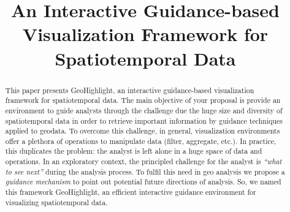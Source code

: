 \documentclass[conference]{IEEEtran}
\newcommand{\sys}{{\sc GeoHighlight}}
\begin{document}
\title{An Interactive Guidance-based Visualization Framework for Spatiotemporal Data}


\author{
\and
{}
}

\maketitle


\begin{abstract}
This paper presents \sys, an interactive guidance-based visualization framework for spatiotemporal data. The main objective of your proposal is provide an environment to guide analysts through the challenge due the huge size and diversity of spatiotemporal data in order to retrieve important information by guidance techniques applied to geodata.  To overcome this challenge, in general, visualization environments offer a plethora of operations to manipulate data (filter, aggregate, etc.). In practice, this duplicates the problem: the analyst is left alone in a huge space of data and operations. In an exploratory context, the principled challenge for the analyst is {\em ``what to see next''} during the analysis process. To fulfil this need in geo analysis  we propose a {\em guidance mechanism} to point out potential future directions of analysis. So, we named this framework \sys,  an efficient interactive guidance environment for visualizing spatiotemporal data. 

\end{abstract}
\end{document}
